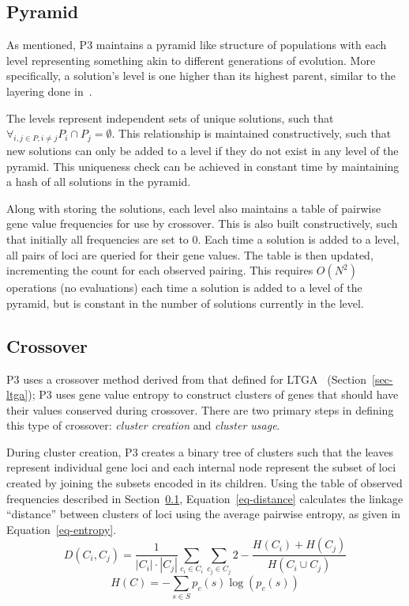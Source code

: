 \documentclass{sig-alternate}
\begin{document}
\subsection{Pyramid}
\label{sec-pyramid}
As mentioned, P3 maintains a pyramid like structure of populations
with each level representing something akin to different generations
of evolution. More specifically, a solution's level is one higher than
its highest parent, similar to the layering done
in~\cite{hornby:2006:alps}.

The levels represent independent sets of unique solutions, such that
$\forall_{i, j \in P, i \neq j} P_i \cap P_j = \emptyset$.  This relationship
is maintained constructively, such that new solutions can only be added to a level
if they do not exist in any level of the pyramid.  This uniqueness check can be
achieved in constant time by maintaining a hash of all solutions in the pyramid.

Along with storing the solutions, each level also maintains a table of pairwise
gene value frequencies for use by crossover.  This is also built constructively, such that initially
all frequencies are set to 0.  Each time a solution is added to a level, all
pairs of loci are queried for their gene values.  The table is then updated,
incrementing the count for each observed pairing.  This requires $O(N^2)$ operations
(no evaluations) each time a solution is added to a level of the pyramid, but is
constant in the number of solutions currently in the level.

\subsection{Crossover}
\label{sec-crossover}
P3 uses a crossover method derived from that defined for LTGA~\cite{thierens:2013:ltgahiff}
(Section~\ref{sec-ltga});
P3 uses gene value entropy to construct clusters of genes that should have their values
conserved during crossover.  There are two primary steps in
defining this type of crossover: \emph{cluster creation} and \emph{cluster usage}.

During cluster creation, P3 creates a binary tree of clusters such that the leaves
represent individual gene loci and each internal node represent the subset of loci created
by joining the subsets encoded in its children.
Using the table of observed frequencies described in Section~\ref{sec-pyramid}, Equation~\ref{eq-distance}
calculates the linkage ``distance'' between clusters of loci using the average pairwise
entropy, as given in Equation~\ref{eq-entropy}.
\begin{equation}
  D(C_i,C_j) = \frac{1}{\left | C_i \right |\cdot \left |C_j \right|}\sum_{c_i \in C_i}\sum_{c_j \in C_j} 
  2 - \frac{H(C_i) + H(C_j)}{H(C_i \cup C_j)}
  \label{eq-distance}
\end{equation}
\begin{equation}
  H(C) = -\sum_{s\in S} p_c(s)\log(p_c(s))
  \label{eq-entropy}
\end{equation}
\end{document}
